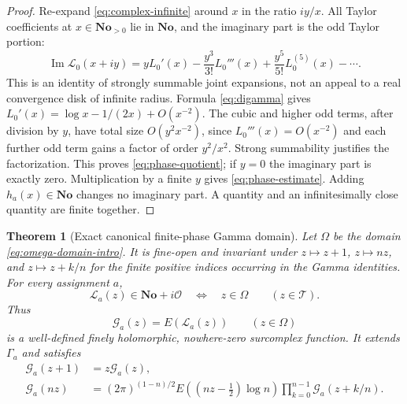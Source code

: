 \documentclass[11pt,letterpaper]{article}
\numberwithin{equation}{section}
\newtheorem{theorem}{Theorem}[section]
\theoremstyle{plain}
\theoremstyle{definition}
\theoremstyle{remark}
\newcommand{\No}{\mathbf{No}}
\newcommand{\Ocal}{\mathcal O}
\newcommand{\Imn}{\operatorname{Im}}
\newcommand{\tube}{\mathcal T}
\newcommand{\Lt}{\mathcal L}
\newcommand{\Gt}{\mathcal G}
\begin{document}
\begin{proof}
Re-expand \eqref{eq:complex-infinite} around $x$ in the ratio $iy/x$.
All Taylor coefficients at $x\in\No_{>0}$ lie in $\No$, and the imaginary part
is the odd Taylor portion:
\[
 \Imn\Lt_0(x+iy)
 =yL_0'(x)-\frac{y^3}{3!}L_0'''(x)
 +\frac{y^5}{5!}L_0^{(5)}(x)-\cdots.
\]
This is an identity of strongly summable joint expansions, not an appeal to
a real convergence disk of infinite radius. Formula \eqref{eq:digamma}
gives $L_0'(x)=\log x-1/(2x)+O(x^{-2})$.
The cubic and higher odd terms, after division by $y$, have total size
$O(y^2x^{-2})$, since $L_0'''(x)=O(x^{-2})$ and each further odd
term gains a factor of order $y^2/x^2$. Strong summability justifies the
factorization. This proves \eqref{eq:phase-quotient}; if $y=0$ the
imaginary part is exactly zero. Multiplication by a finite $y$ gives
\eqref{eq:phase-estimate}. Adding $h_a(x)\in\No$ changes no imaginary
part. A quantity and an infinitesimally close quantity are finite together.
\end{proof}

\begin{theorem}[Exact canonical finite-phase Gamma domain]
\label{thm:phase-domain}
Let $\Omega$ be the domain \eqref{eq:omega-domain-intro}. It is fine-open
and invariant under $z\mapsto z+1$, $z\mapsto nz$, and
$z\mapsto z+k/n$ for the finite positive indices occurring in the Gamma
identities. For every assignment $a$,
\[
 \Lt_a(z)\in\No+i\Ocal\quad\Longleftrightarrow\quad z\in\Omega
 \qquad(z\in\tube).
\]
Thus
\begin{equation}\label{eq:complex-gamma}
 \Gt_a(z)=E(\Lt_a(z))\qquad(z\in\Omega)
\end{equation}
is a well-defined finely holomorphic, nowhere-zero surcomplex function.
It extends $\Gamma_a$ and satisfies
\begin{align}
 \Gt_a(z+1)&=z\Gt_a(z),\label{eq:actual-complex-recurrence}\\
 \Gt_a(nz)&=(2\pi)^{(1-n)/2}E((nz-\tfrac12)\log n)
 \prod_{k=0}^{n-1}\Gt_a(z+k/n).\label{eq:actual-complex-gauss}
\end{align}
\end{theorem}
\end{document}
